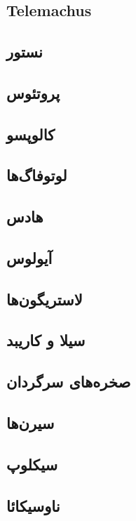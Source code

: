 \documentclass[12pt,onecolumn,a4paper]{book}
\begin{document}
    \part{}
    \chapter[\glsentryname{Telemachus}]{\gls{Telemachus}}

    \chapter{نستور}
    \chapter{پروتئوس}
    \chapter{کالوپسو}
    \chapter{لوتوفاگ‌ها}
    \chapter{هادس}
    \chapter{آیولوس}
    \chapter{لاستریگون‌ها}
    \chapter{سیلا و کاریبد}
    \chapter{صخره‌های سرگردان}
    \chapter{سیرن‌ها}
    \chapter{سیکلوپ}
    \chapter{ناوسیکائا}
\end{document}
